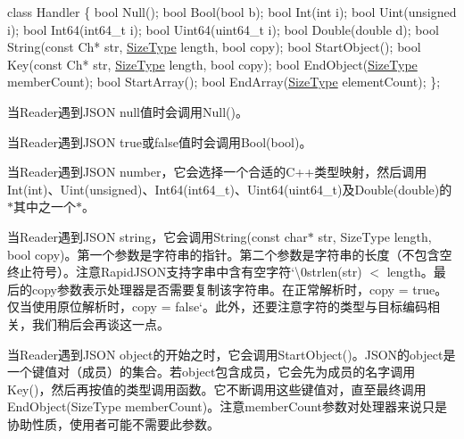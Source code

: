 \begin{DoxyCode}
\textcolor{keyword}{class }Handler \{
    \textcolor{keywordtype}{bool} Null();
    \textcolor{keywordtype}{bool} Bool(\textcolor{keywordtype}{bool} b);
    \textcolor{keywordtype}{bool} Int(\textcolor{keywordtype}{int} i);
    \textcolor{keywordtype}{bool} Uint(\textcolor{keywordtype}{unsigned} i);
    \textcolor{keywordtype}{bool} Int64(int64\_t i);
    \textcolor{keywordtype}{bool} Uint64(uint64\_t i);
    \textcolor{keywordtype}{bool} Double(\textcolor{keywordtype}{double} d);
    \textcolor{keywordtype}{bool} String(\textcolor{keyword}{const} Ch* str, \hyperlink{rapidjson_8h_a5ed6e6e67250fadbd041127e6386dcb5}{SizeType} length, \textcolor{keywordtype}{bool} copy);
    \textcolor{keywordtype}{bool} StartObject();
    \textcolor{keywordtype}{bool} Key(\textcolor{keyword}{const} Ch* str, \hyperlink{rapidjson_8h_a5ed6e6e67250fadbd041127e6386dcb5}{SizeType} length, \textcolor{keywordtype}{bool} copy);
    \textcolor{keywordtype}{bool} EndObject(\hyperlink{rapidjson_8h_a5ed6e6e67250fadbd041127e6386dcb5}{SizeType} memberCount);
    \textcolor{keywordtype}{bool} StartArray();
    \textcolor{keywordtype}{bool} EndArray(\hyperlink{rapidjson_8h_a5ed6e6e67250fadbd041127e6386dcb5}{SizeType} elementCount);
\};
\end{DoxyCode}


当{\ttfamily Reader}遇到\+J\+S\+ON null值时会调用{\ttfamily Null()}。

当{\ttfamily Reader}遇到\+J\+S\+ON true或false值时会调用{\ttfamily Bool(bool)}。

当{\ttfamily Reader}遇到\+J\+S\+ON number，它会选择一个合适的\+C++类型映射，然后调用{\ttfamily Int(int)}、{\ttfamily Uint(unsigned)}、{\ttfamily Int64(int64\+\_\+t)}、{\ttfamily Uint64(uint64\+\_\+t)}及{\ttfamily Double(double)}的$\ast$其中之一个$\ast$。

当{\ttfamily Reader}遇到\+J\+S\+ON string，它会调用{\ttfamily String(const char$\ast$ str, Size\+Type length, bool copy)}。第一个参数是字符串的指针。第二个参数是字符串的长度（不包含空终止符号）。注意\+Rapid\+J\+S\+O\+N支持字串中含有空字符`\textquotesingle{}\textbackslash{}0strlen(str) $<$ length{\ttfamily 。最后的}copy{\ttfamily 参数表示处理器是否需要复制该字符串。在正常解析时，}copy = true{\ttfamily 。仅当使用原位解析时，}copy = false`。此外，还要注意字符的类型与目标编码相关，我们稍后会再谈这一点。

当{\ttfamily Reader}遇到\+J\+S\+ON object的开始之时，它会调用{\ttfamily Start\+Object()}。\+J\+S\+O\+N的object是一个键值对（成员）的集合。若object包含成员，它会先为成员的名字调用{\ttfamily Key()}，然后再按值的类型调用函数。它不断调用这些键值对，直至最终调用{\ttfamily End\+Object(\+Size\+Type member\+Count)}。注意{\ttfamily member\+Count}参数对处理器来说只是协助性质，使用者可能不需要此参数。

